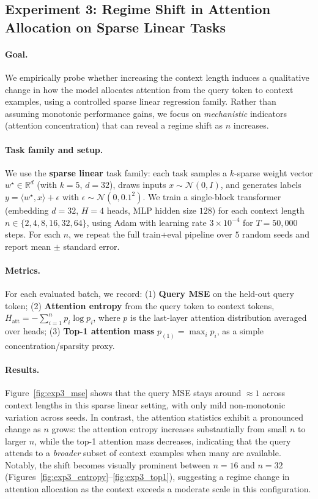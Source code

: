\subsection{Experiment 3: Regime Shift in Attention Allocation on Sparse Linear Tasks}
\label{subsec:exp3}

\paragraph{Goal.}
We empirically probe whether increasing the context length induces a qualitative change in how the model allocates attention from the query token to context examples, using a controlled sparse linear regression family. Rather than assuming monotonic performance gains, we focus on \emph{mechanistic} indicators (attention concentration) that can reveal a regime shift as $n$ increases.

\paragraph{Task family and setup.}
We use the \textbf{sparse linear} task family: each task samples a $k$-sparse weight vector $w^\star \in \mathbb{R}^{d}$ (with $k=5$, $d=32$), draws inputs $x \sim \mathcal{N}(0, I)$, and generates labels
$y = \langle w^\star, x \rangle + \epsilon$ with $\epsilon \sim \mathcal{N}(0, 0.1^2)$.
We train a single-block transformer (embedding $d=32$, $H=4$ heads, MLP hidden size $128$) for each context length
$n \in \{2,4,8,16,32,64\}$, using Adam with learning rate $3\times 10^{-4}$ for $T=50{,}000$ steps. For each $n$, we repeat the full train+eval pipeline over $5$ random seeds and report mean $\pm$ standard error.

\paragraph{Metrics.}
For each evaluated batch, we record:
(1) \textbf{Query MSE} on the held-out query token;
(2) \textbf{Attention entropy} from the query token to context tokens,
$H_{\mathrm{att}} = -\sum_{i=1}^{n} p_i \log p_i$, where $p$ is the last-layer attention distribution averaged over heads;
(3) \textbf{Top-1 attention mass} $p_{(1)}=\max_i p_i$, as a simple concentration/sparsity proxy.

\paragraph{Results.}
Figure~\ref{fig:exp3_mse} shows that the query MSE stays around $\approx 1$ across context lengths in this sparse linear setting, with only mild non-monotonic variation across seeds.
In contrast, the attention statistics exhibit a pronounced change as $n$ grows:
the attention entropy increases substantially from small $n$ to larger $n$, while the top-1 attention mass decreases, indicating that the query attends to a \emph{broader} subset of context examples when many are available.
Notably, the shift becomes visually prominent between $n=16$ and $n=32$ (Figures~\ref{fig:exp3_entropy}--\ref{fig:exp3_top1}), suggesting a regime change in attention allocation as the context exceeds a moderate scale in this configuration.


